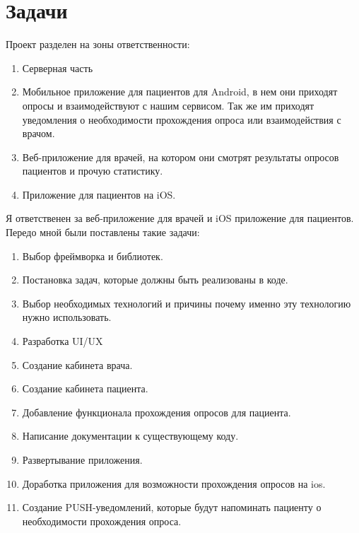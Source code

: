 \chapter{Задачи}\label{ch:2}
Проект разделен на зоны ответственности:
\begin{enumerate}
    \item Серверная часть
    \item Мобильное приложение для пациентов для Android, в нем они приходят опросы и взаимодействуют с нашим сервисом.
    Так же им приходят уведомления о необходимости прохождения опроса или взаимодействия с врачом.
    \item Веб-приложение для врачей, на котором они смотрят результаты опросов пациентов и прочую статистику.
    \item Приложение для пациентов на iOS\@.
\end{enumerate}
Я ответственен за веб-приложение для врачей и iOS приложение для пациентов.
Передо мной были поставлены такие задачи:


\begin{enumerate}
    \item Выбор фреймворка и библиотек.
    \item Постановка задач, которые должны быть реализованы в коде.
    \item Выбор необходимых технологий и причины почему именно эту технологию нужно использовать.
    \item Разработка UI/UX\@
    \item Создание кабинета врача.
    \item Создание кабинета пациента.
    \item Добавление функционала прохождения опросов для пациента.
    \item Написание документации к существующему коду.
    \item Развертывание приложения.
    \item Доработка приложения для возможности прохождения опросов на ios.
    \item Создание PUSH-уведомлений, которые будут напоминать пациенту о необходимости прохождения опроса.
\end{enumerate}